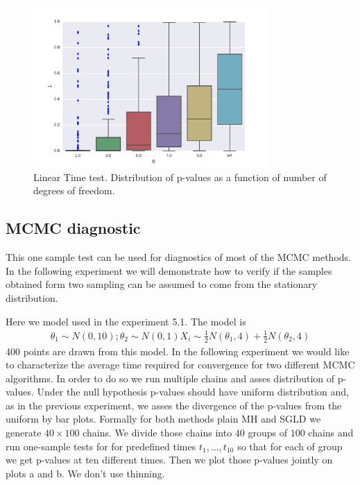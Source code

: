 \documentclass{article}
\begin{document}
\begin{figure}
\label{fig:studentst}
\includegraphics[width=0.8\textwidth]{./img/student.pdf}
\caption{Linear Time test. Distribution of p-values as a function of number of degrees of freedom.}
\end{figure}



\subsection{MCMC diagnostic}
This one sample test can be used for diagnostics of most of the MCMC methods. In the following experiment we will demonstrate how to verify if the samples obtained form two sampling can be assumed to come from the stationary distribution.  

Here we model used in the experiment 5.1. The model is 
\begin{align}
 \theta_1 \sim N(0,10) ; \theta_2 \sim N(0,1)
 X_i \sim \frac {1}{2} N(\theta_1,4) + \frac{1}{2} N(\theta_2,4) 
\end{align}
400 points are drawn from this model. In the following experiment we would like to characterize the average time required for convergence for two different MCMC algorithms. In order to do so we run multiple chains and asses distribution of p-values. Under the null hypothesis p-values should have uniform distribution and, as in the previous experiment, we asses the divergence of the p-values from the uniform by bar plots. Formally for both methods plain MH and SGLD we generate $40 \times 100$ chains. We divide those chains into $40$ groups of $100$ chains and run one-sample tests for for predefined times $t_1,...,t_10$  so that for each of group we get p-values at ten different times. Then we plot those p-values jointly on plots a and b. We don't use thinning.  
\end{document}
